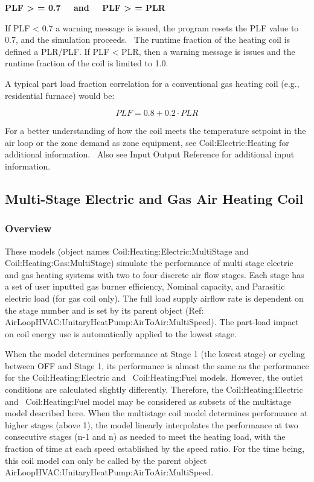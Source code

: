 \textbf{PLF \textgreater{} = 0.7~~ and~~ PLF \textgreater{} = PLR}

If PLF \textless{} 0.7 a warning message is issued, the program resets the PLF value to 0.7, and the simulation proceeds.~ The runtime fraction of the heating coil is defined a PLR/PLF. If PLF \textless{} PLR, then a warning message is issues and the runtime fraction of the coil is limited to 1.0.

A typical part load fraction correlation for a conventional gas heating coil (e.g., residential furnace) would be:

\begin{equation}
PLF = 0.8 + 0.2\cdot PLR
\end{equation}

For a better understanding of how the coil meets the temperature setpoint in the air loop or the zone demand as zone equipment, see Coil:Electric:Heating for additional information.~ Also see Input Output Reference for additional input information.

\subsection{Multi-Stage Electric and Gas Air Heating Coil}\label{multi-stage-electric-and-gas-air-heating-coil}

\subsubsection{Overview}\label{overview-5-001}

These models (object names Coil:Heating:Electric:MultiStage and Coil:Heating:Gas:MultiStage) simulate the performance of multi stage electric and gas heating systems with two to four discrete air flow stages. Each stage has a set of user inputted gas burner efficiency, Nominal capacity, and Parasitic electric load (for gas coil only). The full load supply airflow rate is dependent on the stage number and is set by its parent object (Ref: AirLoopHVAC:UnitaryHeatPump:AirToAir:MultiSpeed). The part-load impact on coil energy use is automatically applied to the lowest stage.

When the model determines performance at Stage 1 (the lowest stage) or cycling between OFF and Stage 1, its performance is almost the same as the performance for the Coil:Heating:Electric and~ Coil:Heating:Fuel models. However, the outlet conditions are calculated slightly differently. Therefore, the Coil:Heating:Electric and~ Coil:Heating:Fuel model may be considered as subsets of the multistage model described here. When the multistage coil model determines performance at higher stages (above 1), the model linearly interpolates the performance at two consecutive stages (n-1 and n) as needed to meet the heating load, with the fraction of time at each speed established by the speed ratio. For the time being, this coil model can only be called by the parent object AirLoopHVAC:UnitaryHeatPump:AirToAir:MultiSpeed.

